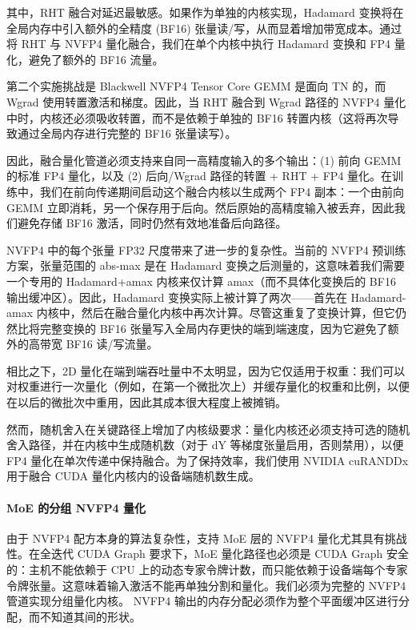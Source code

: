 其中，RHT 融合对延迟最敏感。如果作为单独的内核实现，Hadamard 变换将在全局内存中引入额外的全精度 (BF16) 张量读/写，从而显着增加带宽成本。通过将 RHT 与 NVFP4 量化融合，我们在单个内核中执行 Hadamard 变换和 FP4 量化，避免了额外的 BF16 流量。

第二个实施挑战是 Blackwell NVFP4 Tensor Core GEMM 是面向 TN 的，而 Wgrad 使用转置激活和梯度。因此，当 RHT 融合到 Wgrad 路径的 NVFP4 量化中时，内核还必须吸收转置，而不是依赖于单独的 BF16 转置内核（这将再次导致通过全局内存进行完整的 BF16 张量读写）。

因此，融合量化管道必须支持来自同一高精度输入的多个输出：(1) 前向 GEMM 的标准 FP4 量化，以及 (2) 后向/Wgrad 路径的转置 + RHT + FP4 量化。在训练中，我们在前向传递期间启动这个融合内核以生成两个 FP4 副本：一个由前向 GEMM 立即消耗，另一个保存用于后向。然后原始的高精度输入被丢弃，因此我们避免存储 BF16 激活，同时仍然有效地准备后向路径。

NVFP4 中的每个张量 FP32 尺度带来了进一步的复杂性。当前的 NVFP4 预训练方案，张量范围的 abs-max 是在 Hadamard 变换之后测量的，这意味着我们需要一个专用的 Hadamard+amax 内核来仅计算 amax（而不具体化变换后的 BF16 输出缓冲区）。因此，Hadamard 变换实际上被计算了两次——首先在 Hadamard-amax 内核中，然后在融合量化内核中再次计算。尽管这重复了变换计算，但它仍然比将完整变换的 BF16 张量写入全局内存更快的端到端速度，因为它避免了额外的高带宽 BF16 读/写流量。

相比之下，2D 量化在端到端吞吐量中不太明显，因为它仅适用于权重：我们可以对权重进行一次量化（例如，在第一个微批次上）并缓存量化的权重和比例，以便在以后的微批次中重用，因此其成本很大程度上被摊销。 

然而，随机舍入在关键路径上增加了内核级要求：量化内核还必须支持可选的随机舍入路径，并在内核中生成随机数（对于 dY 等梯度张量启用，否则禁用），以便 FP4 量化在单次传递中保持融合。为了保持效率，我们使用 NVIDIA cuRANDDx\cite{curanddx} 用于融合 CUDA 量化内核内的设备端随机数生成。

\paragraph{MoE 的分组 NVFP4 量化}

由于 NVFP4 配方本身的算法复杂性，支持 MoE 层的 NVFP4 量化尤其具有挑战性。在全迭代 CUDA Graph 要求下，MoE 量化路径也必须是 CUDA Graph 安全的：主机不能依赖于 CPU 上的动态专家令牌计数，而只能依赖于设备端每个专家令牌张量。这意味着输入激活不能再单独分割和量化。我们必须为完整的 NVFP4 管道实现分组量化内核。 NVFP4 输出的内存分配必须作为整个平面缓冲区进行分配，而不知道其间的形状。 

